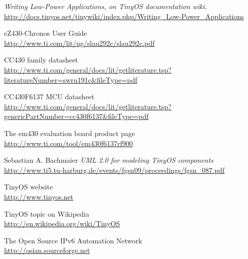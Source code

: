 \begin{thebibliography}{99}
  \textit{Writing Low-Power Applications, on TinyOS documentation wiki.} \\
  \url{http://docs.tinyos.net/tinywiki/index.php/Writing_Low-Power_Applications}

  eZ430-Chronos User Guide \\
  \url{http://www.ti.com/lit/ug/slau292c/slau292c.pdf}

  CC430 family datasheet\\
  \url{http://www.ti.com/general/docs/lit/getliterature.tsp?literatureNumber=swru191c&fileType=pdf}

  CC430F6137 MCU datasheet \\
  \url{http://www.ti.com/general/docs/lit/getliterature.tsp?genericPartNumber=cc430f6137&fileType=pdf}

  The em430 evaluation board product page \\
  \url{http://www.ti.com/tool/em430f6137rf900}

  Sebastian A. Bachmaier
  \textit{UML 2.0 for modeling TinyOS components} \\
  \url{http://www.ti5.tu-harburg.de/events/fgsn09/proceedings/fgsn_087.pdf}

  TinyOS website \\
  \url{http://www.tinyos.net}

  TinyOS topic on Wikipedia \\
  \url{http://en.wikipedia.org/wiki/TinyOS}

  The Open Source IPv6 Automation Network \\
  \url{http://osian.sourceforge.net}


\end{thebibliography}
